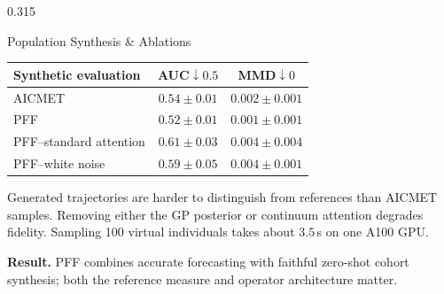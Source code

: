 \documentclass[final]{beamer}
\begin{document}
\begin{frame}[t]
\begin{columns}[T,totalwidth=\textwidth]
\begin{column}{0.315\textwidth}
\begin{block}{Population Synthesis \& Ablations}
{\fontsize{13}{16}\selectfont
\centering
\renewcommand{\arraystretch}{0.94}
\setlength{\tabcolsep}{7pt}
\begin{tabular}{lcc}
\toprule
\textbf{Synthetic evaluation} & \textbf{AUC}$\downarrow 0.5$ & \textbf{MMD}$\downarrow 0$ \\
\midrule
AICMET & $0.54\pm0.01$ & $0.002\pm0.001$ \\
PFF & $\mathbf{0.52\pm0.01}$ & $\mathbf{0.001\pm0.001}$ \\
PFF--standard attention & $0.61\pm0.03$ & $0.004\pm0.004$ \\
PFF--white noise & $0.59\pm0.05$ & $0.004\pm0.001$ \\
\bottomrule
\end{tabular}
}

\vspace{0.14em}
{\footnotesize Generated trajectories are harder to distinguish from references than AICMET samples. Removing either the GP posterior or continuum attention degrades fidelity. Sampling 100 virtual individuals takes about $3.5$\,s on one A100 GPU.}

{\footnotesize\color{PFFGreenDark}\textbf{Result.} PFF combines accurate forecasting with faithful zero-shot cohort synthesis; both the reference measure and operator architecture matter.}
\end{block}

\end{column}
\end{columns}

\end{frame}
\end{document}
